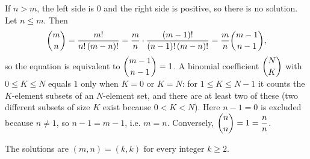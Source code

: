 If $n>m$, the left side is $0$ and the right side is positive, so there is no solution. Let $n\le m$. Then
\[\dbinom mn=\dfrac{m!}{n!\,(m-n)!}=\dfrac mn\cdot\dfrac{(m-1)!}{(n-1)!\,(m-n)!}=\dfrac mn\dbinom{m-1}{n-1},\]
so the equation is equivalent to $\dbinom{m-1}{n-1}=1$. A binomial coefficient $\dbinom{N}{K}$ with $0\le K\le N$ equals $1$ only when $K=0$ or $K=N$: for $1\le K\le N-1$ it counts the $K$-element subsets of an $N$-element set, and there are at least two of these (two different subsets of size $K$ exist because $0<K<N$). Here $n-1=0$ is excluded because $n\ne1$, so $n-1=m-1$, i.e. $m=n$. Conversely, $\dbinom nn=1=\dfrac nn$.

The solutions are $\boxed{(m,n)=(k,k)\text{ for every integer }k\ge2}$.
